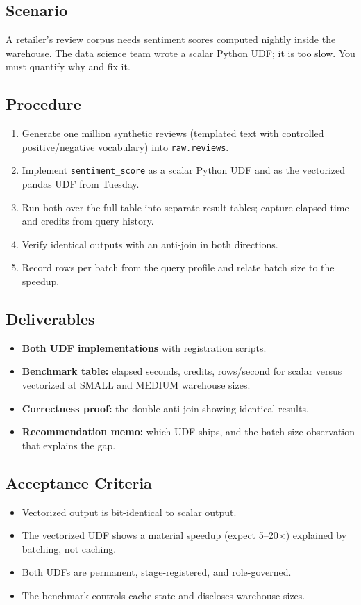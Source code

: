 \subsection*{Scenario}
A retailer's review corpus needs sentiment scores computed nightly inside the warehouse. The data science team wrote a scalar Python UDF; it is too slow. You must quantify why and fix it.

\subsection*{Procedure}
\begin{enumerate}
    \item Generate one million synthetic reviews (templated text with controlled positive/negative vocabulary) into \texttt{raw.reviews}.
    \item Implement \texttt{sentiment\_score} as a scalar Python UDF and as the vectorized pandas UDF from Tuesday.
    \item Run both over the full table into separate result tables; capture elapsed time and credits from query history.
    \item Verify identical outputs with an anti-join in both directions.
    \item Record rows per batch from the query profile and relate batch size to the speedup.
\end{enumerate}

\subsection*{Deliverables}
\begin{itemize}
    \item \textbf{Both UDF implementations} with registration scripts.
    \item \textbf{Benchmark table:} elapsed seconds, credits, rows/second for scalar versus vectorized at SMALL and MEDIUM warehouse sizes.
    \item \textbf{Correctness proof:} the double anti-join showing identical results.
    \item \textbf{Recommendation memo:} which UDF ships, and the batch-size observation that explains the gap.
\end{itemize}

\subsection*{Acceptance Criteria}
\begin{itemize}
    \item Vectorized output is bit-identical to scalar output.
    \item The vectorized UDF shows a material speedup (expect 5--20$\times$) explained by batching, not caching.
    \item Both UDFs are permanent, stage-registered, and role-governed.
    \item The benchmark controls cache state and discloses warehouse sizes.
\end{itemize}

